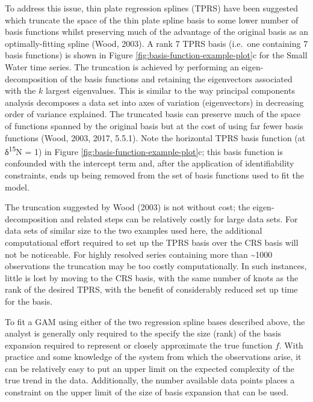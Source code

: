 \documentclass[12pt,]{article}
\begin{document}
To address this issue, thin plate regression splines (TPRS) have been
suggested which truncate the space of the thin plate spline basis to
some lower number of basis functions whilst preserving much of the
advantage of the original basis as an optimally-fitting spline (Wood,
2003). A rank 7 TPRS basis (i.e.~one containing 7 basis functions) is
shown in Figure \ref{fig:basis-function-example-plot}c for the Small
Water time series. The truncation is achieved by performing an
eigen-decomposition of the basis functions and retaining the
eigenvectors associated with the \(k\) largest eigenvalues. This is
similar to the way principal components analysis decomposes a data set
into axes of variation (eigenvectors) in decreasing order of variance
explained. The truncated basis can preserve much of the space of
functions spanned by the original basis but at the cost of using far
fewer basis functions (Wood, 2003, 2017, 5.5.1). Note the horizontal
TPRS basis function (at δ\textsuperscript{15}N = 1) in Figure
\ref{fig:basis-function-example-plot}c; this basis function is
confounded with the intercept term and, after the application of
identifiability constraints, ends up being removed from the set of basis
functions used to fit the model.

The truncation suggested by Wood (2003) is not without cost; the
eigen-decomposition and related steps can be relatively costly for large
data sets. For data sets of similar size to the two examples used here,
the additional computational effort required to set up the TPRS basis
over the CRS basis will not be noticeable. For highly resolved series
containing more than \textasciitilde{}1000 observations the truncation
may be too costly computationally. In such instances, little is lost by
moving to the CRS basis, with the same number of knots as the rank of
the desired TPRS, with the benefit of considerably reduced set up time
for the basis.

To fit a GAM using either of the two regression spline bases described
above, the analyst is generally only required to the specify the size
(rank) of the basis expansion required to represent or closely
approximate the true function \(f\). With practice and some knowledge of
the system from which the observations arise, it can be relatively easy
to put an upper limit on the expected complexity of the true trend in
the data. Additionally, the number available data points places a
constraint on the upper limit of the size of basis expansion that can be
used.
\end{document}
